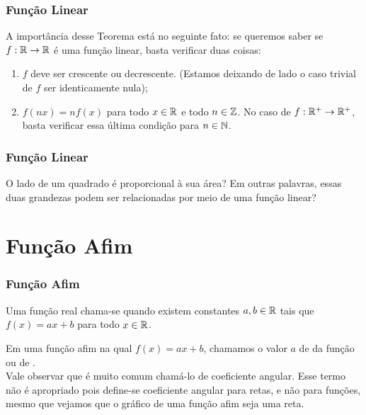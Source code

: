 \documentclass[brazil, notheorems, 10pt]{beamer}
\begin{document}
\begin{frame}
\frametitle{Função Linear} %

A importância desse Teorema está no seguinte fato: se queremos saber
se $f: \mathbb{R} \to \mathbb{R}$ é uma função linear, basta verificar duas coisas:
\begin{enumerate}[1ª:]
	\item $f$ deve ser crescente ou decrescente. (Estamos deixando de
	lado o caso trivial de $f$ ser identicamente nula);
	\item $f(nx) = n f(x)$ para todo $x \in \mathbb{R}$ e todo $n \in \mathbb{Z}$. No
	caso de $f: \mathbb{R}^+ \to \mathbb{R}^+$, basta verificar essa última condição
	para $n \in \mathbb{N}$.
\end{enumerate}

\end{frame}



\begin{frame}
\frametitle{Função Linear} %

\begin{Exem}
O lado de um quadrado é proporcional à sua área? Em outras palavras,
essas duas grandezas podem ser relacionadas por meio de uma função
linear?
\end{Exem}

\end{frame}



\section{Função Afim}
\begin{frame}
\frametitle{Função Afim} %

\begin{Def}
Uma função real chama-se  quando existem constantes $a, b
\in \mathbb{R}$ tais que $f(x) = ax +b$ para todo $x\in \mathbb{R}$.
\end{Def}

Em uma função afim na qual $f(x) = ax +b$, chamamos o valor $a$ de
 da função ou de .\\
Vale observar que é muito comum chamá-lo de coeficiente angular.
Esse termo não é apropriado pois define-se coeficiente angular para
retas, e não para funções, mesmo que vejamos que o gráfico de uma
função afim seja uma reta.

\end{frame}
\end{document}
